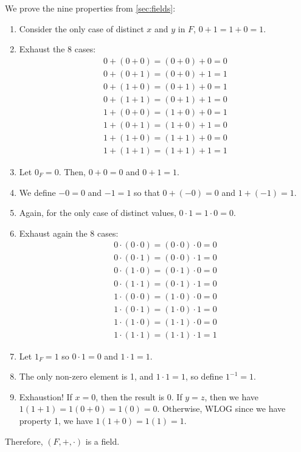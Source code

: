 \documentclass{agony}
\begin{document}
\begin{prf}
  We prove the nine properties from \cref{sec:fields}:
  \begin{enumerate}
    \item Consider the only case of distinct $x$ and $y$ in $F$, $0 + 1 = 1 + 0 = 1$.
    \item Exhaust the 8 cases:
          \begin{align*}
            0 + (0 + 0) = (0 + 0) + 0 = 0 \\
            0 + (0 + 1) = (0 + 0) + 1 = 1 \\
            0 + (1 + 0) = (0 + 1) + 0 = 1 \\
            0 + (1 + 1) = (0 + 1) + 1 = 0 \\
            1 + (0 + 0) = (1 + 0) + 0 = 1 \\
            1 + (0 + 1) = (1 + 0) + 1 = 0 \\
            1 + (1 + 0) = (1 + 1) + 0 = 0 \\
            1 + (1 + 1) = (1 + 1) + 1 = 1
          \end{align*}
    \item Let $0_F=0$. Then, $0 + 0 = 0$ and $0 + 1 = 1$.
    \item We define $-0 = 0$ and $-1 = 1$ so that $0 + (-0) = 0$ and $1 + (-1) = 1$.
    \item Again, for the only case of distinct values, $0 \cdot 1 = 1 \cdot 0 = 0$.
    \item Exhaust again the 8 cases:
          \begin{align*}
            0 \cdot (0 \cdot 0) = (0 \cdot 0) \cdot 0 = 0 \\
            0 \cdot (0 \cdot 1) = (0 \cdot 0) \cdot 1 = 0 \\
            0 \cdot (1 \cdot 0) = (0 \cdot 1) \cdot 0 = 0 \\
            0 \cdot (1 \cdot 1) = (0 \cdot 1) \cdot 1 = 0 \\
            1 \cdot (0 \cdot 0) = (1 \cdot 0) \cdot 0 = 0 \\
            1 \cdot (0 \cdot 1) = (1 \cdot 0) \cdot 1 = 0 \\
            1 \cdot (1 \cdot 0) = (1 \cdot 1) \cdot 0 = 0 \\
            1 \cdot (1 \cdot 1) = (1 \cdot 1) \cdot 1 = 1
          \end{align*}
    \item Let $1_F=1$ so $0 \cdot 1 = 0$ and $1 \cdot 1 = 1$.
    \item The only non-zero element is 1, and $1 \cdot 1 = 1$, so define $1^{-1} = 1$.
    \item Exhaustion! If $x=0$, then the result is 0.
          If $y = z$, then we have $1(1 + 1) = 1(0 + 0) = 1(0) = 0$.
          Otherwise, WLOG since we have property 1, we have $1(1 + 0) = 1(1) = 1$.
  \end{enumerate}
  Therefore, $(F,+,\cdot)$ is a field.
\end{prf}
\end{document}

